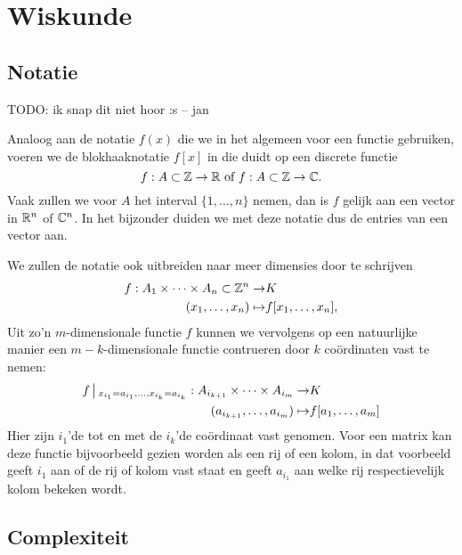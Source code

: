 \section{Wiskunde}

\subsection{Notatie}
TODO: ik snap dit niet hoor :s -- jan

Analoog aan de notatie $f(x)$ die we in het algemeen voor een functie gebruiken, voeren we de blokhaaknotatie $f[x]$ in die duidt op een discrete functie
\[
f:A\subset \mathbb{Z}\to \mathbb{R} \text{ of } f:A\subset \mathbb{Z}\to \mathbb{C}.  
\]
Vaak zullen we voor $A$ het interval $\{1,\ldots,n\}$ nemen, 
dan is $f$ gelijk aan een vector in $\mathbb{R}^n$ of $\mathbb{C}^n$.
In het bijzonder duiden we met deze notatie dus de entries van een vector aan.

We zullen de notatie ook uitbreiden naar meer dimensies door te schrijven
\begin{equation*}
\begin{split}
f: A_1\times \cdots \times A_n\subset \mathbb{Z}^n \to& K \\
       (x_1,\ldots,x_n) \mapsto& f[x_1,\ldots,x_n],
\end{split}
\end{equation*}
Uit zo'n $m$-dimensionale functie $f$ kunnen we vervolgens op een natuurlijke manier een $m-k$-dimensionale
functie contrueren door $k$ co\"ordinaten vast te nemen:
\begin{equation*}
\begin{split}
f\,\big|\,_{x_{i_1}=a_{i_1},\ldots,x_{i_k}=a_{i_k}}: A_{i_{k+1}}\times\cdots\times A_{i_{m}} \to& K \\
(a_{i_{k+1}},\ldots,a_{i_{m}}) \mapsto& f[a_1,\ldots,a_m]
\end{split}
\end{equation*}
Hier zijn $i_1$'de tot en met de $i_k$'de co\"ordinaat vast genomen. Voor een matrix kan deze functie
bijvoorbeeld gezien worden als een rij of een kolom, in dat voorbeeld geeft $i_1$ aan of de rij of kolom
vast staat en geeft $a_{i_1}$ aan welke rij respectievelijk kolom bekeken wordt.

\subsection{Complexiteit}

